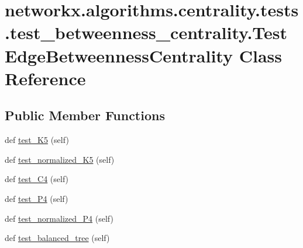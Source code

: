 \hypertarget{classnetworkx_1_1algorithms_1_1centrality_1_1tests_1_1test__betweenness__centrality_1_1TestEdgeBetweennessCentrality}{}\section{networkx.\+algorithms.\+centrality.\+tests.\+test\+\_\+betweenness\+\_\+centrality.\+Test\+Edge\+Betweenness\+Centrality Class Reference}
\label{classnetworkx_1_1algorithms_1_1centrality_1_1tests_1_1test__betweenness__centrality_1_1TestEdgeBetweennessCentrality}
\subsection*{Public Member Functions}
\begin{DoxyCompactItemize}
\item 
def \hyperlink{classnetworkx_1_1algorithms_1_1centrality_1_1tests_1_1test__betweenness__centrality_1_1TestEdgeBetweennessCentrality_adc8f4d15e0064d194ad3696223564627}{test\+\_\+\+K5} (self)
\item 
def \hyperlink{classnetworkx_1_1algorithms_1_1centrality_1_1tests_1_1test__betweenness__centrality_1_1TestEdgeBetweennessCentrality_a34d5b2e38622eedcd7c753f6e319054e}{test\+\_\+normalized\+\_\+\+K5} (self)
\item 
def \hyperlink{classnetworkx_1_1algorithms_1_1centrality_1_1tests_1_1test__betweenness__centrality_1_1TestEdgeBetweennessCentrality_aa3f3c5348330876bed3bf7295930caba}{test\+\_\+\+C4} (self)
\item 
def \hyperlink{classnetworkx_1_1algorithms_1_1centrality_1_1tests_1_1test__betweenness__centrality_1_1TestEdgeBetweennessCentrality_a18c8527e27fbd1c9b665cbe7eb6813b4}{test\+\_\+\+P4} (self)
\item 
def \hyperlink{classnetworkx_1_1algorithms_1_1centrality_1_1tests_1_1test__betweenness__centrality_1_1TestEdgeBetweennessCentrality_ab2be0bf84253cc871fb75da399e8ad5e}{test\+\_\+normalized\+\_\+\+P4} (self)
\item 
def \hyperlink{classnetworkx_1_1algorithms_1_1centrality_1_1tests_1_1test__betweenness__centrality_1_1TestEdgeBetweennessCentrality_a78292dde2700cd51814375cb541b5b27}{test\+\_\+balanced\+\_\+tree} (self)
\end{DoxyCompactItemize}



